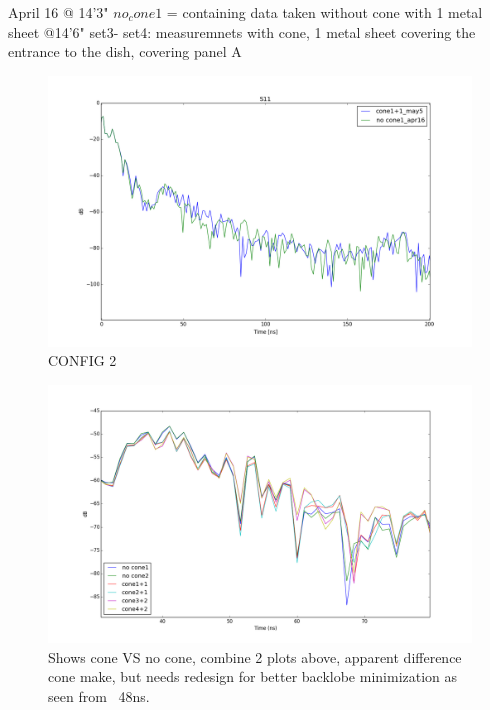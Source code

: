 \documentclass[preprint]{aastex}  %
\begin{document}
April 16
@ 14'3" 
$no_cone1$ = containing data taken without cone with 1 metal sheet
@14'6"
set3- set4: measuremnets with cone, 1 metal sheet covering the entrance to the dish, covering panel A
\begin{figure}[H]
	\begin{center}
	\includegraphics[width =\textwidth]{reflectometry_plots/May5/nocone_vs_set3zoom}
	\caption{CONFIG 2
\label{Fig:} }
	\end{center}
\end{figure}

\begin{figure}[H]
	\begin{center}
	\includegraphics[width =\textwidth]{reflectometry_plots/May5/S11_1st2nd_refl}
	\caption{Shows cone VS no cone, combine 2 plots above, apparent difference cone make, but needs redesign for better backlobe minimization as seen from ~48ns.
\label{Fig:} }
	\end{center}
\end{figure}
\end{document}
